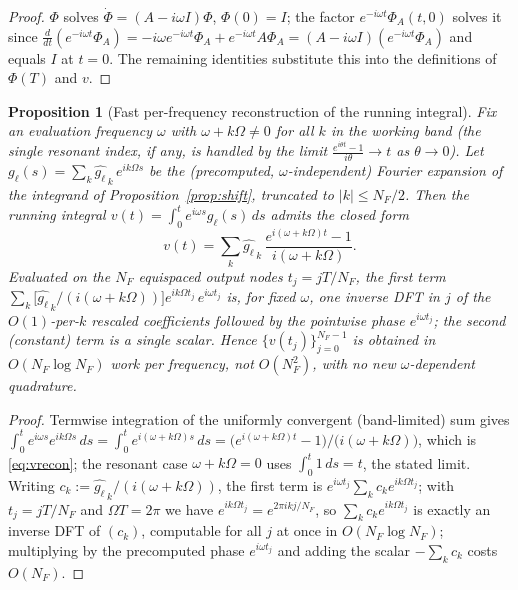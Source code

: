 \documentclass{amsart}
\newtheorem{proposition}{Proposition}
\theoremstyle{definition}
\begin{document}
\begin{proof}
$\Phi$ solves $\dot\Phi=(A-i\omega I)\Phi$, $\Phi(0)=I$; the factor
$e^{-i\omega t}\Phi_A(t,0)$ solves it since
$\tfrac{d}{dt}(e^{-i\omega t}\Phi_A)=-i\omega e^{-i\omega t}\Phi_A+e^{-i\omega
t}A\Phi_A=(A-i\omega I)(e^{-i\omega t}\Phi_A)$ and equals $I$ at $t=0$. The
remaining identities substitute this into the definitions of $\Phi(T)$ and
$v$.
\end{proof}

\begin{proposition}[Fast per-frequency reconstruction of the running integral]
\label{prop:vrecon}
Fix an evaluation frequency $\omega$ with $\omega+k\Omega\ne0$ for all $k$ in the
working band (the single resonant index, if any, is handled by the limit
$\frac{e^{i\theta t}-1}{i\theta}\to t$ as $\theta\to0$). Let
$g_\ell(s)=\sum_{k}\widehat{g_{\ell}}_{\,k}\,e^{ik\Omega s}$ be the (precomputed,
$\omega$-independent) Fourier expansion of the integrand of
Proposition~\ref{prop:shift}, truncated to $|k|\le N_F/2$. Then the running
integral $v(t)=\int_0^t e^{i\omega s}g_\ell(s)\,ds$ admits the closed form
\begin{equation}\label{eq:vrecon}
v(t)=\sum_{k}\widehat{g_{\ell}}_{\,k}\,
\frac{e^{i(\omega+k\Omega)t}-1}{i(\omega+k\Omega)} .
\end{equation}
Evaluated on the $N_F$ equispaced output nodes $t_j=jT/N_F$, the first term
$\sum_k\big[\widehat{g_{\ell}}_{\,k}/(i(\omega+k\Omega))\big]e^{ik\Omega t_j}\,
e^{i\omega t_j}$ is, for fixed $\omega$, one inverse DFT in $j$ of the
$O(1)$-per-$k$ rescaled coefficients followed by the pointwise phase
$e^{i\omega t_j}$; the second (constant) term is a single scalar. Hence
$\{v(t_j)\}_{j=0}^{N_F-1}$ is obtained in $O(N_F\log N_F)$ work per frequency,
\emph{not} $O(N_F^2)$, with no new $\omega$-dependent quadrature.
\end{proposition}

\begin{proof}
Termwise integration of the uniformly convergent (band-limited) sum gives
$\int_0^t e^{i\omega s}e^{ik\Omega s}\,ds=\int_0^t e^{i(\omega+k\Omega)s}\,ds
=\big(e^{i(\omega+k\Omega)t}-1\big)/\big(i(\omega+k\Omega)\big)$, which is
\eqref{eq:vrecon}; the resonant case $\omega+k\Omega=0$ uses
$\int_0^t 1\,ds=t$, the stated limit. Writing
$c_k:=\widehat{g_{\ell}}_{\,k}/(i(\omega+k\Omega))$, the first term is
$e^{i\omega t_j}\sum_k c_k e^{ik\Omega t_j}$; with $t_j=jT/N_F$ and
$\Omega T=2\pi$ we have $e^{ik\Omega t_j}=e^{2\pi i kj/N_F}$, so
$\sum_k c_k e^{ik\Omega t_j}$ is exactly an inverse DFT of $(c_k)$, computable for
all $j$ at once in $O(N_F\log N_F)$; multiplying by the precomputed phase
$e^{i\omega t_j}$ and adding the scalar $-\sum_k c_k$ costs $O(N_F)$.
\end{proof}
\end{document}
